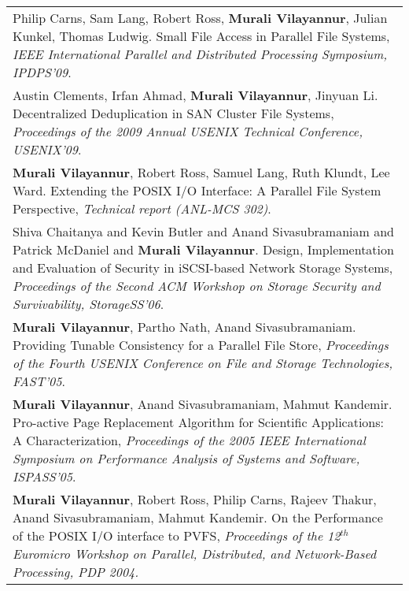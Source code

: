 \documentclass{article}
\begin{document}
  \begin{center}
  \begin{tabularx}{6.2in}{X}
  {Philip Carns, Sam Lang, Robert Ross, {\bf Murali Vilayannur}, Julian Kunkel, Thomas Ludwig.
     Small File Access in Parallel File Systems,
   \emph {IEEE International Parallel and Distributed Processing Symposium,
      IPDPS'09}}. \\
  {Austin Clements, Irfan Ahmad, {\bf Murali Vilayannur}, Jinyuan Li.
     Decentralized Deduplication in SAN Cluster File Systems,
   \emph {Proceedings of the 2009 Annual USENIX Technical Conference,
      USENIX'09}}. \\
  {\bf Murali Vilayannur}, Robert Ross, Samuel Lang, Ruth Klundt, Lee Ward.
  Extending the POSIX I/O Interface: A Parallel File System Perspective,
  \emph {Technical report (ANL-MCS 302)}.\\
  Shiva Chaitanya and Kevin Butler and Anand Sivasubramaniam and Patrick McDaniel and {\bf Murali Vilayannur}.
  Design, Implementation and Evaluation of Security in iSCSI-based Network Storage Systems,
  \emph {Proceedings of the Second ACM Workshop on Storage Security and Survivability,
  StorageSS'06}.\\
  {\bf Murali Vilayannur}, Partho Nath, Anand Sivasubramaniam.
  Providing Tunable Consistency for a Parallel File Store,
  \emph {Proceedings of the Fourth USENIX Conference on File and Storage Technologies,
  FAST'05}.\\
   {\bf Murali Vilayannur}, Anand Sivasubramaniam, Mahmut Kandemir.  
	Pro-active Page Replacement Algorithm for Scientific Applications: A Characterization, 
	\emph {Proceedings of the 2005 IEEE International Symposium on Performance Analysis of Systems and
	Software, ISPASS'05}. \\
   {\bf Murali Vilayannur}, Robert Ross, Philip Carns, Rajeev Thakur, Anand Sivasubramaniam,
	Mahmut Kandemir. On the Performance of the POSIX I/O interface to PVFS,  \emph{Proceedings
	of the 12$^{th}$ Euromicro Workshop on Parallel, Distributed, and Network-Based Processing, PDP
	2004.} \\

\end{tabularx}
\end{center}
\end{document}
